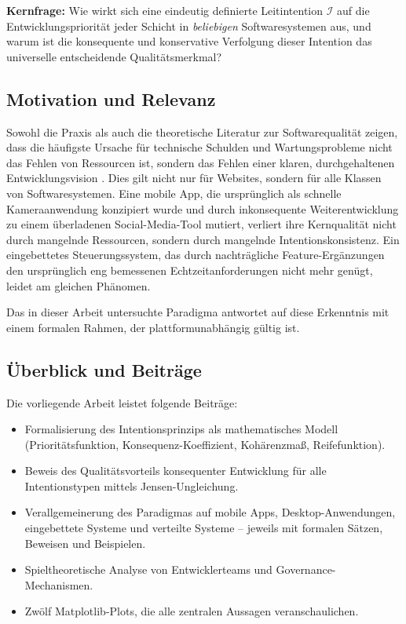 ﻿\documentclass[a4paper,12pt]{article}
\theoremstyle{definition}
\begin{document}
\textbf{Kernfrage:} Wie wirkt sich eine eindeutig definierte Leitintention
$\mathcal{I}$ auf die Entwicklungspriorität jeder Schicht in \emph{beliebigen}
Softwaresystemen aus, und warum ist die konsequente und konservative Verfolgung
dieser Intention das universelle entscheidende Qualitätsmerkmal?

\subsection{Motivation und Relevanz}

Sowohl die Praxis als auch die theoretische Literatur zur Softwarequalität
zeigen, dass die häufigste Ursache für technische Schulden und Wartungsprobleme
nicht das Fehlen von Ressourcen ist, sondern das Fehlen einer klaren,
durchgehaltenen Entwicklungsvision \cite{cunningham1992debt, fowler2018refactoring}.
Dies gilt nicht nur für Websites, sondern für alle Klassen von Softwaresystemen.
Eine mobile App, die ursprünglich als schnelle Kameraanwendung konzipiert wurde
und durch inkonsequente Weiterentwicklung zu einem überladenen Social-Media-Tool
mutiert, verliert ihre Kernqualität nicht durch mangelnde Ressourcen, sondern
durch mangelnde Intentionskonsistenz. Ein eingebettetes Steuerungssystem, das
durch nachträgliche Feature-Ergänzungen den ursprünglich eng bemessenen
Echtzeitanforderungen nicht mehr genügt, leidet am gleichen Phänomen.

Das in dieser Arbeit untersuchte Paradigma antwortet auf diese Erkenntnis mit
einem formalen Rahmen, der plattformunabhängig gültig ist.

\subsection{Überblick und Beiträge}

Die vorliegende Arbeit leistet folgende Beiträge:

\begin{itemize}
    \item Formalisierung des Intentionsprinzips als mathematisches Modell
          (Prioritätsfunktion, Konsequenz-Koeffizient, Kohärenzmaß, Reifefunktion).
    \item Beweis des Qualitätsvorteils konsequenter Entwicklung für alle
          Intentionstypen mittels Jensen-Ungleichung.
    \item Verallgemeinerung des Paradigmas auf mobile Apps, Desktop-Anwendungen,
          eingebettete Systeme und verteilte Systeme -- jeweils mit formalen
          Sätzen, Beweisen und Beispielen.
    \item Spieltheoretische Analyse von Entwicklerteams und Governance-Mechanismen.
    \item Zwölf Matplotlib-Plots, die alle zentralen Aussagen veranschaulichen.
\end{itemize}
\end{document}
